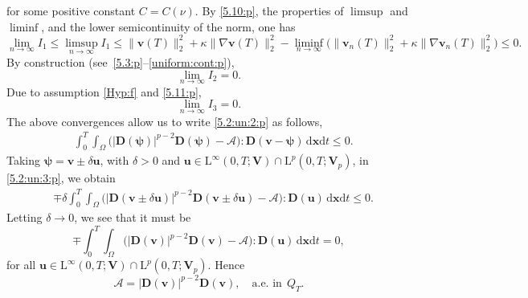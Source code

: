 \documentclass[12pt,reqno]{amsart}
\numberwithin{equation}{section}
\theoremstyle{definition}
\def\dxt{\,\mathrm{d}\boldsymbol{x}\mathrm{d}t}
\def\L{\mathrm{L}}
\def\uu{\boldsymbol{u}}  %
\def\vv{\boldsymbol{v}}
\def\bfV{\mathbf{V}}
\def\bfD{\mathbf{D}}
\def\bmcA{\boldsymbol{\mathcal{A}}}
\def\bpsi{\boldsymbol{\psi}}
\begin{document}
for some positive constant $C=C(\nu)$.
By \eqref{5.10:p}, the properties of $\limsup$ and $\liminf$, and the lower semicontinuity of the norm, one has
\begin{equation*}
\lim\limits_{n\to\infty}I_1\leq\limsup\limits_{n\to\infty}I_1\leq
{\|\vv(T)\|^2_{2}+\kappa\|\nabla\vv(T)\|_{2}^2}-\liminf\limits_{n\to\infty}\big(\|\vv_n(T)\|^2_{2}+\kappa\|\nabla\vv_n(T)\|_{2}^2\big)\leq 0.
\end{equation*}
By construction (see~\eqref{5.3:p}--\eqref{uniform:cont:p}),
\begin{equation*}
\lim\limits_{n\to\infty}I_2= 0.
\end{equation*}
Due to assumption \eqref{Hyp:f} and \eqref{5.11:p},
\begin{equation*}
\lim\limits_{n\to\infty}I_3= 0.
\end{equation*}
The above convergences allow us to write \eqref{5.2:un:2:p} as follows,
\begin{equation}\label{5.2:un:3:p}
\begin{split}
& \!\int_{0}^{T}\!\!\!\!\int_{\Omega}\big(|\bfD(\bpsi)|^{p-2}\bfD(\bpsi)-\bmcA\big):\bfD(\vv-\bpsi) \dxt
\leq 0.
\end{split}
\end{equation}
Taking $\bpsi=\vv\pm\delta\uu$, with $\delta>0$ and $\uu\in\L^\infty(0,T;\bfV)\cap\L^p(0,T;\bfV_p)$, in \eqref{5.2:un:3:p}, we obtain
\begin{equation*}
\begin{split}
& \mp\delta\!\int_{0}^{T}\!\!\!\!\int_{\Omega}\big(|\bfD(\vv\pm\delta\uu)|^{p-2}\bfD(\vv\pm\delta\uu)-\bmcA\big):\bfD(\uu) \dxt
\leq 0.
\end{split}
\end{equation*}
Letting $\delta\longrightarrow 0$, we see that it must be
\begin{equation*}
\mp\!\int_{0}^{T}\!\!\!\!\int_{\Omega}\big(|\bfD(\vv)|^{p-2}\bfD(\vv)-\bmcA\big):\bfD(\uu) \dxt= 0,
\end{equation*}
 for all $\uu\in\L^\infty(0,T;\bfV)\cap\L^p(0,T;\bfV_p)$.
Hence
\begin{equation}\label{A:lim}
\bmcA=|\bfD(\vv)|^{p-2}\bfD(\vv),\quad \mbox{a.e. in}\ \ Q_T.
\end{equation}
\end{document}
